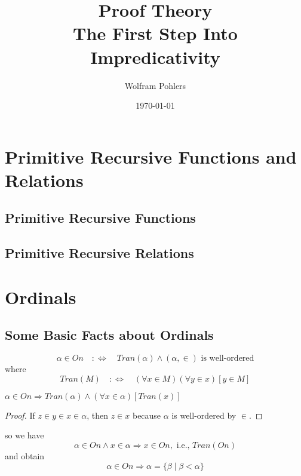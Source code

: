 \documentclass[11pt]{article}
\author{Wolfram Pohlers}
\date{\today}
\title{Proof Theory \\ The First Step Into Impredicativity}
\begin{document}
\maketitle
\tableofcontents

\section{Primitive Recursive Functions and Relations}
\label{sec:orgd01ae9c}
\subsection{Primitive Recursive Functions}
\label{sec:org969e495}
\subsection{Primitive Recursive Relations}
\label{sec:orga48c28f}
\section{Ordinals}
\label{sec:org7c706fd}
\subsection{Some Basic Facts about Ordinals}
\label{sec:org42080ec}
\begin{equation*}
\alpha\in On\quad:\Leftrightarrow\quad Tran(\alpha)\wedge(\alpha,\in)\text{ is well-ordered}
\end{equation*}
where
\begin{equation*}
Tran(M)\quad:\Leftrightarrow\quad(\forall x\in M)(\forall y\in x)[y\in M]
\end{equation*}
\begin{proposition}[]
\(\alpha\in On\Rightarrow Tran(\alpha)\wedge(\forall x\in\alpha)[Tran(x)]\)
\end{proposition}

\begin{proof}
If \(z\in y\in x\in \alpha\), then \(z\in x\) because \(\alpha\) is well-ordered by \(\in\).
\end{proof}
so we have
\begin{equation*}
\alpha\in On\wedge x\in\alpha\Rightarrow x\in On, \text{ i.e., }Tran(On)
\end{equation*}
and obtain
\begin{equation*}
\alpha\in On\Rightarrow\alpha=\{\beta\mid\beta<\alpha\}
\end{equation*}
\end{document}

